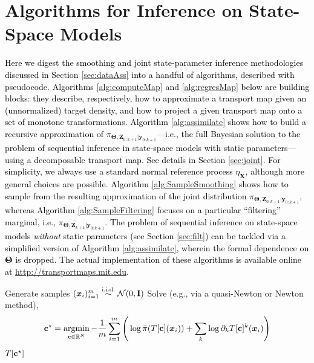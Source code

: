 \documentclass[twoside,11pt]{article}
\def\argmin{\mathop{\mathrm{argmin}}}
\newcommand{\Xb}{\boldsymbol{X}}
\newcommand{\yb}{\boldsymbol{y}}
\newcommand{\Zb}{\boldsymbol{Z}}
\newcommand{\vhyp}{\boldsymbol{\Theta}}
\newcommand{\hrevone}{\textcolor{black} }
\begin{document}
\section{Algorithms for Inference on State-Space Models}
\label{sec:algo}
%
%
%
%
%
\hrevone{
Here we digest the smoothing and joint state-parameter inference methodologies discussed in Section
  \ref{sec:dataAss} into a handful of algorithms, described with pseudocode.
%
%
Algorithms \ref{alg:computeMap} and \ref{alg:regresMap} below are
building blocks: they describe, respectively, how to approximate a
transport map given an (unnormalized) target
density, and how to project a given transport map onto a
set of monotone transformations.
Algorithm \ref{alg:assimilate} shows how to build a
recursive approximation of  $\pi_{\vhyp,\Zb_{0:k+1} \vert 
\yb_{0:k+1} }$---i.e., the full Bayesian
solution to the problem of sequential inference in state-space models with static parameters---using a decomposable transport map.
%
See details in Section \ref{sec:joint}.
For simplicity, we always use a standard normal reference process $\eta_{\Xb}$, 
although more general choices are possible. 
Algorithm \ref{alg:SampleSmoothing} shows how to sample from 
the resulting approximation of the joint distribution 
$\pi_{\vhyp,\Zb_{0:k+1} \vert 
\yb_{0:k+1} }$,
%
whereas
Algorithm \ref{alg:SampleFiltering}  
focuses on a particular ``filtering'' marginal, i.e.,
$\pi_{ \vhyp ,\Zb_{k+1} \vert \yb_{0:k+1}}$.
The problem of sequential inference on state-space models {\it without} static parameters (see Section \ref{sec:filt}) can be tackled via
a simplified version of Algorithm \ref{alg:assimilate}, wherein 
the formal  dependence on $\vhyp$ is dropped.
The actual implementation of these algorithms is
available online at \url{http://transportmaps.mit.edu}.
%
%
%
%
%
%
%
}
%
\begin{algorithm}[H]
%
  \caption{
    {\bf (Computation of a monotone map)} \\
    Given an
    unnormalized target density $\bar{\pi}$
    and a parametric triangular monotone map $T[{\bf c}]$ 
    of the form \eqref{eq:monotone}, defined by an arbitrary 
    set of coefficients
    ${\bf c}\in\mathbb{R}^N$, find
    the optimal coefficients ${\bf c}^\star$ 
    according to \eqref{OptimDirectSAA}.
  }
  \label{alg:computeMap}
  \begin{algorithmic}[1]
    \State Generate samples 
    $({\bm x}_i)_{i=1}^m \overset{\text{i.i.d.}} \sim \mathcal{N}(0,{\bf I})$
    \State Solve (e.g., via a quasi-Newton or Newton method),
    $$
    {\bf c}^\star = \argmin_{{\bf c}\in\mathbb{R}^N} 
    -\frac{1}{m}\sum_{i=1}^m 
    \left( 
      \,\log \bar{\pi}(T[{\bf c}]({\bm x}_i)) + 
      \sum_k \log \partial_k T[{\bf c}]^k({\bm x}_i) 
    \right)
    $$
    \State \Return $T[{\bf c}^\star]$
    \EndProcedure
  \end{algorithmic}
\end{algorithm}
\end{document}
